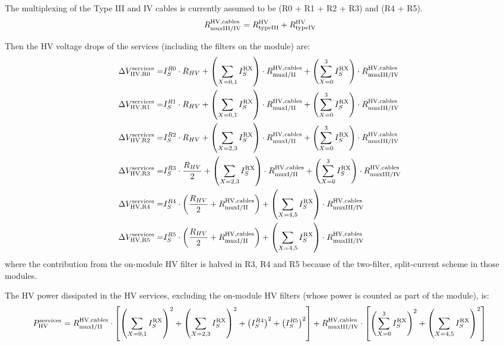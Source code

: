 The multiplexing of the Type III and IV cables is currently
assumed to be (R0 + R1 + R2 + R3) and (R4 + R5).
\[
R^\text{HV,cables}_\text{muxIII/IV} = R^\text{HV}_\text{typeIII} + R^\text{HV}_\text{typeIV}
\]

Then the HV voltage drops of the services (including the filters on the module) are:
\def\dvservices{\Delta V^\text{services}}
\begin{align}
\dvservices_\text{HV,R0} =& I^{R0}_S \cdot R_{HV}           + \left(\sum_{X=0,1} I^\text{RX}_S\right) \cdot \rhvmuxI + \left(\sum^3_{X=0} I^\text{RX}_S\right) \cdot \rhvmuxIII \\
\dvservices_\text{HV,R1} =& I^{R1}_S \cdot R_{HV}           + \left(\sum_{X=0,1} I^\text{RX}_S\right) \cdot \rhvmuxI + \left(\sum^3_{X=0} I^\text{RX}_S\right) \cdot \rhvmuxIII \\
\dvservices_\text{HV,R2} =& I^{R2}_S \cdot R_{HV}           + \left(\sum_{X=2,3} I^\text{RX}_S\right) \cdot \rhvmuxI + \left(\sum^3_{X=0} I^\text{RX}_S\right) \cdot \rhvmuxIII \\
\dvservices_\text{HV,R3} =& I^{R3}_S \cdot \frac{R_{HV}}{2} + \left(\sum_{X=2,3} I^\text{RX}_S\right) \cdot \rhvmuxI + \left(\sum^3_{X=0} I^\text{RX}_S\right) \cdot \rhvmuxIII \\
\dvservices_\text{HV,R4} =&                                I^{R4}_S \cdot \left(\frac{R_{HV}}{2} +\rhvmuxI \right)   + \left(\sum_{X=4,5} I^\text{RX}_S\right) \cdot \rhvmuxIII \\
\dvservices_\text{HV,R5} =&                                I^{R5}_S \cdot \left(\frac{R_{HV}}{2} +\rhvmuxI \right)   + \left(\sum_{X=4,5} I^\text{RX}_S\right) \cdot \rhvmuxIII \\
\end{align}
%
where the contribution from the on-module HV filter is halved in R3, R4 and R5 because of the
two-filter, split-current scheme in those modules.

The HV power dissipated in the HV services, excluding the on-module HV filters (whose power is counted
as part of the module), is:
\def\phvservices{P^\text{services}_\text{HV}}
\[
\phvservices = \rhvmuxI \cdot \left[ \left(\sum_{X=0,1} I^\text{RX}_S\right)^2
                                    +\left(\sum_{X=2,3} I^\text{RX}_S\right)^2
                                    +\left(I^{R4}_S\right)^2
                                    +\left(I^{R5}_S\right)^2
                                    \right]
               + \rhvmuxIII \cdot \left[ \left(\sum^3_{X=0} I^\text{RX}_S\right)^2
                                        +\left(\sum_{X=4,5} I^\text{RX}_S\right)^2
                                        \right]
\]

